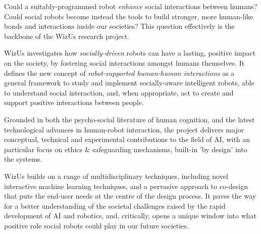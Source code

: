 \documentclass[11pt]{report}
\newcommand{\project}{WizUs\xspace}
\begin{document}
Could a suitably-programmed robot \emph{enhance} social interactions between
humans? Could social robots become instead the tools to build stronger, more human-like
bonds and interactions inside our societies? This question effectively is the
backbone of the \project research project.

\project investigates how \emph{socially-driven} robots can have a lasting, positive
impact on the society, by fostering social interactions amongst humans
themselves. It defines the new concept of \emph{robot-supported human-human
interactions} as a general framework to study and implement socially-aware
intelligent robots, able to understand social interaction, and, when
appropriate, act to create and support positive interactions between people.

Grounded in both the psycho-social literature of human cognition, and the latest
technological advances in human-robot interaction, the project delivers
major conceptual, technical and experimental contributions to the field of AI, 
with an particular focus on ethics \& safeguarding mechanisms, built-in 'by 
design' into the systems.

\project builds on a range of multidisciplinary techniques, including novel
interactive machine learning techniques, and a pervasive approach to co-design
that puts the end-user needs at the centre of the design process. It paves the
way for a better understanding of the societal challenges raised by the rapid
development of AI and robotics, and, critically, opens a unique window into what
positive role social robots could play in our future societies.

\newpage

\tableofcontents

\pagebreak


\newcommand{\wpOne}{Project management \& dissemination}
\newcommand{\wpOneShort}{\wpOne{}}

\newcommand{\wpTwo}{Framing robot-supported human-human interaction}
\newcommand{\wpTwoShort}{Framing r-HHI}


\newcommand{\wpThree}{Ethical-by-design socio-cognitive architecture for robot-supported human-human interactions}
\newcommand{\wpThreeShort}{Socio-cognitive architecture}
\end{document}
